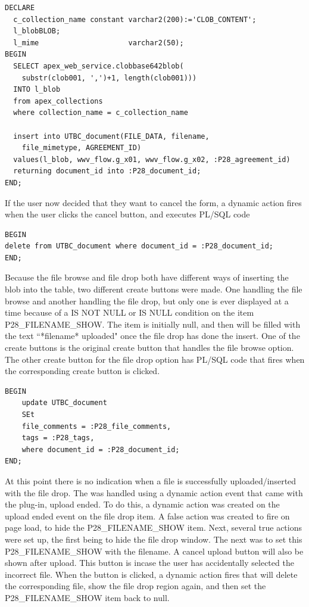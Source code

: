 \documentclass{report}
\begin{document}
\begin{lstlisting}[caption = PL/SQL on filedrop item]
DECLARE
  c_collection_name constant varchar2(200):='CLOB_CONTENT';
  l_blobBLOB;
  l_mime				     varchar2(50);
BEGIN
  SELECT apex_web_service.clobbase642blob(
  	substr(clob001, ',')+1, length(clob001)))
  INTO l_blob
  from apex_collections
  where collection_name = c_collection_name
  
  insert into UTBC_document(FILE_DATA, filename, 
  	file_mimetype, AGREEMENT_ID) 
  values(l_blob, wwv_flow.g_x01, wwv_flow.g_x02, :P28_agreement_id)
  returning document_id into :P28_document_id;
END;
\end{lstlisting}

If the user now decided that they want to cancel the form, a dynamic action fires when the user clicks the cancel button, and executes PL/SQL code

\begin{lstlisting}[caption=close dialog PL/SQL]
BEGIN
delete from UTBC_document where document_id = :P28_document_id;
END;
\end{lstlisting}

Because the file browse and file drop both have different ways of inserting the blob into the table, two different create buttons were made. One handling the file browse and another handling the file drop, but only one is ever displayed at a time because of a IS NOT NULL or IS NULL condition on the item P28\_FILENAME\_SHOW. The item is initially null, and then will be filled with the text ``*filename* uploaded" once the file drop has done the insert. 
One of the create buttons is the original create button that handles the file browse option. The other create button for the file drop option has PL/SQL code that fires when the corresponding create button is clicked. 

\begin{lstlisting}[caption=update statement for filedrop]
BEGIN
	update UTBC_document
	SEt
	file_comments = :P28_file_comments, 
	tags = :P28_tags,
	where document_id = :P28_document_id;
END;
\end{lstlisting}

At this point there is no indication when a file is successfully uploaded/inserted with the file drop. The was handled using a dynamic action event that came with the plug-in, upload ended.  To do this, a dynamic action was created on the upload ended event on the file drop item. A false action was created to fire on page load, to hide the P28\_FILENAME\_SHOW item. Next, several true actions were set up, the first being to hide the file drop window. The next was to set this P28\_FILENAME\_SHOW with the filename. A cancel upload button will also be shown after upload. This button is incase the user has accidentally selected the incorrect file. When the button is clicked, a dynamic action fires that will delete the corresponding file, show the file drop region again, and then set the P28\_FILENAME\_SHOW item back to null.
\end{document}
